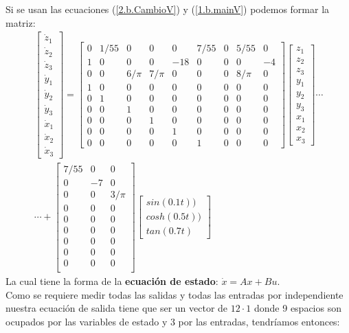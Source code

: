 \documentclass[letterpaper, 12pt]{article}
\begin{document}
\begin{enumerate}
\begin{enumerate}
Si se usan las ecuaciones (\ref{2.b.CambioV}) y (\ref{1.b.mainV}) podemos formar la matriz: \
\begin{multline*}
\begin{bmatrix}
\dot{z}_1\\ 
\dot{z}_2\\ 
\dot{z}_3\\ 
\dot{y}_1\\ 
\dot{y}_2\\ 
\dot{y}_3\\ 
\dot{x}_1\\ 
\dot{x}_2\\ 
\dot{x}_3
\end{bmatrix}
=
\begin{bmatrix}
0 &1/55  &0  &0  &0  &7/55  &0  &5/55  &0 \\ 
1 &0  &0  &0  &-18  &0  &0  &0  &-4 \\ 
0 &0  &6/\pi &7/\pi   &0  &0  &0  &8/\pi   &0 \\ 
1 &0  &0  &0  &0  &0  &0  &0  &0 \\ 
0 &1  &0  &0  &0  &0  &0  &0  &0 \\ 
0 &0  &1  &0  &0  &0  &0  &0  &0 \\ 
0 &0  &0  &1  &0  &0  &0  &0  &0 \\ 
0 &0  &0  &0  &1  &0  &0  &0  &0 \\ 
0 &0  &0  &0  &0  &1  &0  &0  &0 
\end{bmatrix}
\begin{bmatrix}
z_1\\ 
z_2\\ 
z_3\\ 
y_1\\ 
y_2\\ 
y_3\\ 
x_1\\ 
x_2\\ 
x_3
\end{bmatrix}
\cdots \\
\cdots +
\begin{bmatrix}
7/55 &0  &0   \\ 
0 &-7  &0   \\ 
0 &0  &3/\pi \\
0  &0  &0 \\
0  &0  &0 \\
0  &0  &0 \\
0  &0  &0 \\
0  &0  &0 \\
0  &0  &0 \\
\end{bmatrix}
\begin{bmatrix}
sin(0.1t))\\ 
cosh(0.5t))\\ 
tan(0.7t)
\end{bmatrix}
\end{multline*}
La cual tiene la forma de la \textbf{ecuación de estado}: $\dot{x}=Ax+Bu$. \\
Como se requiere medir todas las salidas y todas las entradas por independiente nuestra ecuación de salida tiene que ser un vector de $12\cdot 1$ donde 9 espacios son ocupados por las variables de estado y 3 por las entradas, tendríamos entonces:



\end{enumerate}
\end{enumerate}
\end{document}
